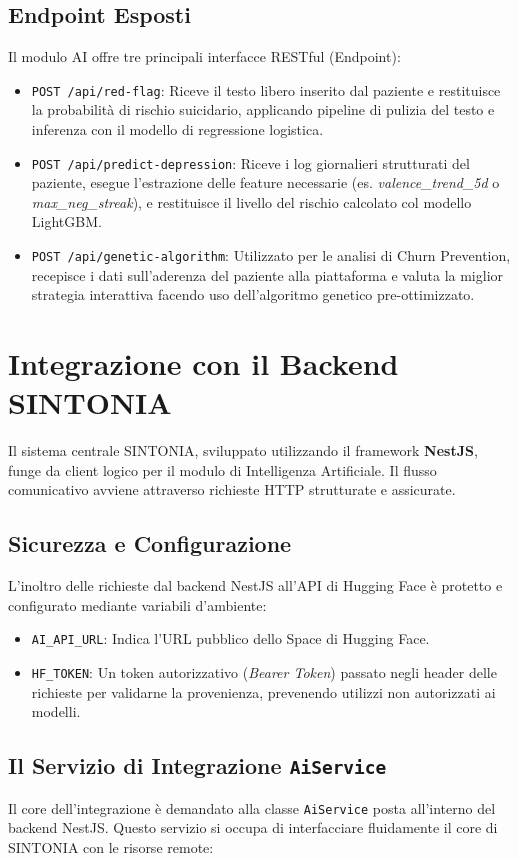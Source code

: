 \subsection{Endpoint Esposti}
Il modulo AI offre tre principali interfacce RESTful (Endpoint):
\begin{itemize}
    \item \texttt{POST /api/red-flag}: Riceve il testo libero inserito dal paziente e restituisce la probabilità di rischio suicidario, applicando pipeline di pulizia del testo e inferenza con il modello di regressione logistica.
    \item \texttt{POST /api/predict-depression}: Riceve i log giornalieri strutturati del paziente, esegue l'estrazione delle feature necessarie (es. \textit{valence\_trend\_5d} o \textit{max\_neg\_streak}), e restituisce il livello del rischio calcolato col modello LightGBM.
    \item \texttt{POST /api/genetic-algorithm}: Utilizzato per le analisi di Churn Prevention, recepisce i dati sull'aderenza del paziente alla piattaforma e valuta la miglior strategia interattiva facendo uso dell'algoritmo genetico pre-ottimizzato.
\end{itemize}

\section{Integrazione con il Backend SINTONIA}
Il sistema centrale SINTONIA, sviluppato utilizzando il framework \textbf{NestJS}, funge da client logico per il modulo di Intelligenza Artificiale. Il flusso comunicativo avviene attraverso richieste HTTP strutturate e assicurate.

\subsection{Sicurezza e Configurazione}
L'inoltro delle richieste dal backend NestJS all'API di Hugging Face è protetto e configurato mediante variabili d'ambiente:
\begin{itemize}
    \item \texttt{AI\_API\_URL}: Indica l'URL pubblico dello Space di Hugging Face.
    \item \texttt{HF\_TOKEN}: Un token autorizzativo (\textit{Bearer Token}) passato negli header delle richieste per validarne la provenienza, prevenendo utilizzi non autorizzati ai modelli.
\end{itemize}

\subsection{Il Servizio di Integrazione \texttt{AiService}}
Il core dell'integrazione è demandato alla classe \texttt{AiService} posta all'interno del backend NestJS. Questo servizio si occupa di interfacciare fluidamente il core di SINTONIA con le risorse remote:

